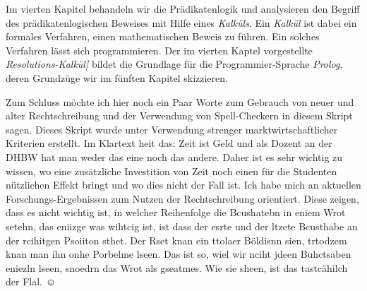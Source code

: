 Im vierten Kapitel behandeln wir die Pr\"{a}dikatenlogik und analysieren den Begriff
des pr\"{a}dikatenlogischen Beweises mit Hilfe eines \emph{Kalk\"{u}ls}.  Ein
\emph{Kalk\"{u}l} ist dabei ein formales Verfahren, einen mathematischen Beweis zu f\"{u}hren.
Ein solches Verfahren l\"{a}sst sich programmieren.  Der im vierten Kaptel vorgestellte
\emph{Resolutions-Kalk\"{u}l]} bildet  die Grundlage f\"{u}r die
Programmier-Sprache \textsl{Prolog}, deren Grundz\"{u}ge wir im f\"{u}nften Kapitel
skizzieren.  

Zum Schluss m\"{o}chte ich hier noch ein Paar Worte zum Gebrauch von neuer und alter
Rechtschreibung und der Verwendung von Spell-Checkern in diesem Skript sagen.
Dieses Skript wurde unter Verwendung strenger marktwirtschaftlicher Kriterien
erstellt.  Im Klartext hei\3t das: Zeit ist Geld und als Dozent an der DHBW hat man
weder das eine noch das andere.  Daher ist es sehr wichtig zu wissen, wo eine
zus\"{a}tzliche Investition von Zeit noch einen f\"{u}r die Studenten n\"{u}tzlichen Effekt
bringt und wo dies nicht der Fall ist.  Ich habe mich an aktuellen
Forschungs-Ergebnissen zum Nutzen der Rechtschreibung orientiert. Diese zeigen,
dass es nicht wichtig ist, in welcher Reihenfolge die Bcushatebn in eniem Wrot
setehn, das eniizge was wihtcig ist, ist dass der esrte und der ltzete Bcusthabe
an der rcihitgen Psoiiton sthet. Der Rset knan ein ttolaer B\"{o}ldisnn sien,
trtodzem knan man ihn onhe Porbelme lseen. Das ist so, wiel wir nciht jdeen
Buhctsaben eniezln lseen, snoedrn das Wrot als gseatmes.  Wie sie sheen, ist das
tastc\"{a}hilch der Flal. $\displaystyle\smiley$




